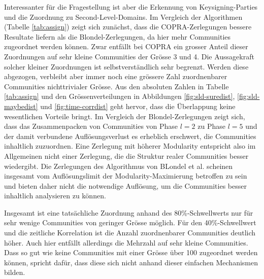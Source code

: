 Interessanter f\"ur die Fragestellung ist aber die Erkennung von
Keysigning-Parties und die Zuordnung zu Second-Level-Domains. Im
Vergleich der Algorithmen (Tabelle \ref{tab:assign}) zeigt sich
zun\"achst, dass die COPRA-Zerlegungen bessere Resultate liefern als
die Blondel-Zerlegungen, da hier mehr Communities zugeordnet werden
k\"onnen. Zwar entf\"allt bei COPRA ein grosser Anteil dieser
Zuordnungen auf sehr kleine Communities der Gr\"osse 3 und 4. Die
Aussagekraft solcher kleiner Zuordnungen ist selbstverst\"andlich sehr
begrenzt. Werden diese abgezogen, verbleibt aber immer noch eine
gr\"ossere Zahl zuordnenbarer Communities nichttrivialer Gr\"osse. Aus
den absoluten Zahlen in Tabelle \ref{tab:assign} und den
Gr\"ossenverteilungen in Abbildungen \ref{fig:sld-suredist},
\ref{fig:sld-maybedist} und \ref{fig:time-corrdist} geht hervor, dass
die \"Uberlappung keine wesentlichen Vorteile bringt. Im Vergleich der
Blondel-Zerlegungen zeigt sich, dass das Zusammenpacken von
Communities von Phase $l=2$ zu Phase $l=5$ und der damit verbundene
Aufl\"osungsverlust es erheblich erschwert, die Communities inhaltlich
zuzuordnen. Eine Zerlegung mit h\"oherer Modularity entspricht also im
Allgemeinen nicht einer Zerlegung, die die Struktur realer Communities
besser wiedergibt. Die Zerlegungen des Algorithmus von BLondel et
al. scheinen insgesamt vom Aufl\"osungslimit der
Modularity-Maximierung betroffen zu sein und bieten daher nicht die
notwendige Aufl\"osung, um die Communities besser inhaltlich
analysieren zu k\"onnen.

Insgesamt ist eine tats\"achliche Zuordnung anhand des
80\%-Schwellwerts nur f\"ur sehr wenige Communities von geringer
Gr\"osse m\"oglich. F\"ur den 40\%-Schwellwert und die zeitliche
Korrelation ist die Anzahl zuordnenbarer Communities deutlich
h\"oher. Auch hier entf\"allt allerdings die Mehrzahl auf sehr kleine
Communities.  Dass so gut wie keine Communities mit einer Gr\"osse
\"uber 100 zugeordnet werden k\"onnen, spricht daf\"ur, dass diese
sich nicht anhand dieser einfachen Mechanismen bilden.

